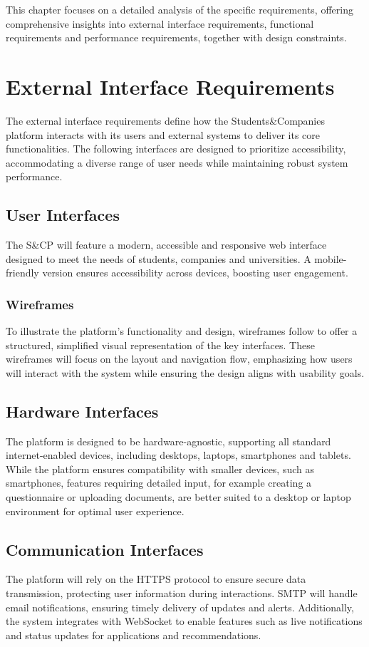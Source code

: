 This chapter focuses on a detailed analysis of the specific requirements, offering comprehensive insights into external interface requirements, functional requirements and performance requirements, together with design constraints.

\section{External Interface Requirements}
The external interface requirements define how the Students\&Companies platform interacts with its users and external systems to deliver its core functionalities.
The following interfaces are designed to prioritize accessibility, accommodating a diverse range of user needs while maintaining robust system performance.

\subsection{User Interfaces}
The S\&CP will feature a modern, accessible and responsive web interface designed to meet the needs of students, companies and universities.
A mobile-friendly version ensures accessibility across devices, boosting user engagement.

\subsubsection{Wireframes}
To illustrate the platform’s functionality and design, wireframes follow to offer a structured, simplified visual representation of the key interfaces.
These wireframes will focus on the layout and navigation flow, emphasizing how users will interact with the system while ensuring the design aligns with usability goals.

\subsection{Hardware Interfaces}
The platform is designed to be hardware-agnostic, supporting all standard internet-enabled devices, including desktops, laptops, smartphones and tablets.
While the platform ensures compatibility with smaller devices, such as smartphones, features requiring detailed input, for example creating a questionnaire or uploading  documents, are better suited to a desktop or laptop environment for optimal user experience.

\subsection{Communication Interfaces}
The platform will rely on the HTTPS protocol to ensure secure data transmission, protecting user information during interactions.
SMTP will handle email notifications, ensuring timely delivery of updates and alerts.
Additionally, the system integrates with WebSocket to enable features such as live notifications and status updates for applications and recommendations.


